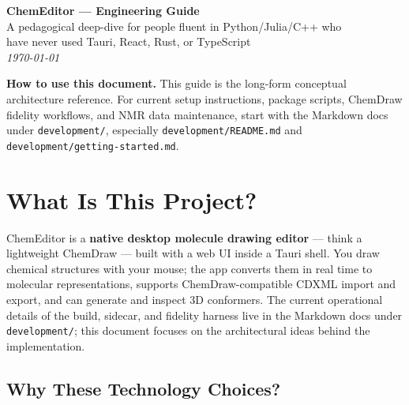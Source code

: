 \documentclass[11pt,a4paper]{article}
\begin{document}
\begin{center}
  {\LARGE\bfseries ChemEditor --- Engineering Guide}\\[0.6em]
  {\large A pedagogical deep-dive for people fluent in Python/Julia/C++ who\\
  have never used Tauri, React, Rust, or TypeScript}\\[1em]
  \textit{\today}
\end{center}

\noindent\textbf{How to use this document.}
This guide is the long-form conceptual architecture reference.
For current setup instructions, package scripts, ChemDraw fidelity workflows, and NMR data
maintenance, start with the Markdown docs under \texttt{development/}, especially
\texttt{development/README.md} and \texttt{development/getting-started.md}.

\tableofcontents
\newpage

\section{What Is This Project?}
\label{sec:what}

ChemEditor is a \textbf{native desktop molecule drawing editor} --- think a lightweight
ChemDraw --- built with a web UI inside a Tauri shell. You draw chemical structures
with your mouse; the app converts them in real time to molecular representations,
supports ChemDraw-compatible CDXML import and export, and can generate and inspect 3D
conformers. The current operational details of the build, sidecar, and fidelity harness
live in the Markdown docs under \texttt{development/}; this document focuses on the
architectural ideas behind the implementation.

\subsection{Why These Technology Choices?}
\end{document}
